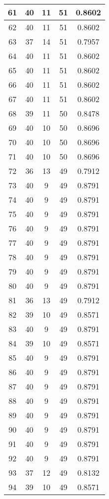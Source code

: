 \documentclass[letterpaper, 12pt]{article}
\begin{document}
\begin{longtable}{|c|c|c|c|c|}
\hline
61 & 40 & 11 & 51 & 0.8602 \\
\hline
62 & 40 & 11 & 51 & 0.8602 \\
\hline
63 & 37 & 14 & 51 & 0.7957 \\
\hline
64 & 40 & 11 & 51 & 0.8602 \\
\hline
65 & 40 & 11 & 51 & 0.8602 \\
\hline
66 & 40 & 11 & 51 & 0.8602 \\
\hline
67 & 40 & 11 & 51 & 0.8602 \\
\hline
68 & 39 & 11 & 50 & 0.8478 \\
\hline
69 & 40 & 10 & 50 & 0.8696 \\
\hline
70 & 40 & 10 & 50 & 0.8696 \\
\hline
71 & 40 & 10 & 50 & 0.8696 \\
\hline
72 & 36 & 13 & 49 & 0.7912 \\
\hline
73 & 40 & 9 & 49 & 0.8791 \\
\hline
74 & 40 & 9 & 49 & 0.8791 \\
\hline
75 & 40 & 9 & 49 & 0.8791 \\
\hline
76 & 40 & 9 & 49 & 0.8791 \\
\hline
77 & 40 & 9 & 49 & 0.8791 \\
\hline
78 & 40 & 9 & 49 & 0.8791 \\
\hline
79 & 40 & 9 & 49 & 0.8791 \\
\hline
80 & 40 & 9 & 49 & 0.8791 \\
\hline
81 & 36 & 13 & 49 & 0.7912 \\
\hline
82 & 39 & 10 & 49 & 0.8571 \\
\hline
83 & 40 & 9 & 49 & 0.8791 \\
\hline
84 & 39 & 10 & 49 & 0.8571 \\
\hline
85 & 40 & 9 & 49 & 0.8791 \\
\hline
86 & 40 & 9 & 49 & 0.8791 \\
\hline
87 & 40 & 9 & 49 & 0.8791 \\
\hline
88 & 40 & 9 & 49 & 0.8791 \\
\hline
89 & 40 & 9 & 49 & 0.8791 \\
\hline
90 & 40 & 9 & 49 & 0.8791 \\
\hline
91 & 40 & 9 & 49 & 0.8791 \\
\hline
92 & 40 & 9 & 49 & 0.8791 \\
\hline
93 & 37 & 12 & 49 & 0.8132 \\
\hline
94 & 39 & 10 & 49 & 0.8571 \\

\end{longtable}
\end{document}
